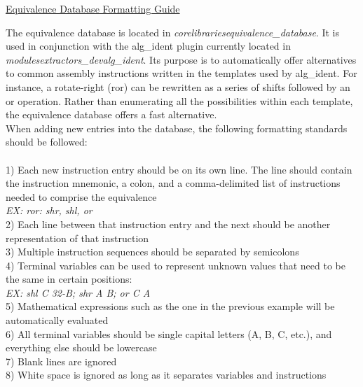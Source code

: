 \documentclass[]{article}
\begin{document}
\begin{center}
\underline{\LARGE Equivalence Database Formatting Guide}\\
\end{center}
\vspace{5 mm}
The equivalence database is located in \emph{core\/libraries\/equivalence\_database}.  It is used in conjunction with the alg\_ident plugin currently located in \emph{modules\/extractors\_dev\/alg\_ident}.
Its purpose is to automatically offer alternatives to common assembly instructions written in the templates used by alg\_ident.  For instance, a rotate-right (ror) can be rewritten as a series of shifts
followed by an or operation.  Rather than enumerating all the possibilities within each template, the equivalence database offers a fast alternative. \\

\noindent When adding new entries into the database, the following formatting standards should be followed:\\ \\
1) Each new instruction entry should be on its own line.  The line should contain the instruction mnemonic, a colon, and a comma-delimited list of instructions needed to comprise the equivalence\\
\emph{EX: ror: shr, shl, or}\\
2) Each line between that instruction entry and the next should be another representation of that instruction\\
3) Multiple instruction sequences should be separated by semicolons\\
4) Terminal variables can be used to represent unknown values that need to be the same in certain positions:\\
\emph{EX: shl C 32-B; shr A B; or C A}\\
5) Mathematical expressions such as the one in the previous example will be automatically evaluated\\
6) All terminal variables should be single capital letters (A, B, C, etc.), and everything else should be lowercase\\
7) Blank lines are ignored\\
8) White space is ignored as long as it separates variables and instructions\\



  
\end{document}
